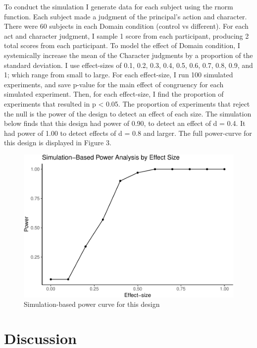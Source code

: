 \documentclass[man]{apa6}
\begin{document}
To conduct the simulation I generate data for each subject using the
rnorm function. Each subject made a judgment of the principal's action
and character. There were 60 subjects in each Domain condition (control
vs different). For each act and character judgment, I sample 1 score
from each participant, producing 2 total scores from each participant.
To model the effect of Domain condition, I systemically increase the
mean of the Character judgments by a proportion of the standard
deviation. I use effect-sizes of 0.1, 0.2, 0.3, 0.4, 0.5, 0.6, 0.7, 0.8,
0.9, and 1; which range from small to large. For each effect-size, I run
100 simulated experiments, and save p-value for the main effect of
congruency for each simulated experiment. Then, for each effect-size, I
find the proportion of experiments that resulted in p \textless{} 0.05.
The proportion of experiments that reject the null is the power of the
design to detect an effect of each size. The simulation below finds that
this design had power of 0.90, to detect an effect of d = 0.4. It had
power of 1.00 to detect effects of d = 0.8 and larger. The full
power-curve for this design is displayed in Figure 3.

\begin{figure}
\centering
\includegraphics{APA_Report_files/figure-latex/powerfig-1.pdf}
\caption{\label{fig:powerfig}Simulation-based power curve for this design}
\end{figure}

\section{Discussion}\label{discussion}
\end{document}
